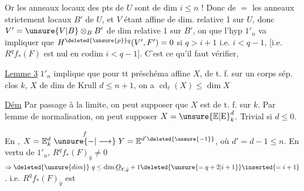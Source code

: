 Or les anneaux locaux des pts de $U$ sont
de dim \uline{$i\leq n$} ! Donc de $=$ les anneaux
strictement locaux $B'$ de $U$, et  $V$ étant
affine de dim. relative 1 sur $U$, donc
$V'=\unsure{V|B}\otimes_B B'$  de dim relative 1 sur $B'$, on
 que l'hyp $1'_n$ va impliquer
que $H^{\deleted{\unsure{p}}q}(V',F')=0$ si $q>i+1$ i.e. \uline{$i<q-1$},
[i.e. $R^qf_*(F)$ est nul en codim $i<q-1$].
C'est ce qu'il faut vérifier,  

\uline{Lemme 3} $1'_n$  
implique que
pour tt préschéma affine $X$,  de
t. f. sur un corps sép. clos $k$, $X$ de
dim de Krull $d\leq n+1$, on a $\operatorname{cd}_{\ell}(X)\leq\dim X$

\uline{Dém} Par passage à la limite, on peut supposer
que $X$ est de t. f. sur $k$.  
 Par lemme
de normalisation, on peut supposer $X={\unsure{\mathbb E|\mathrm E}}^d_k$.
 Trivial si $d\leq0$.

En , $X=\mathbb E^d_k\mathrel{\overset{f}{\unsure{-|\longrightarrow}}}Y=\mathbb E^{d'\deleted{\unsure{-1}}}$, où $d'=d-1\leq n$.
En vertu de $1'_n$, $R^qf_*(F)_{\bar y}\ne0$
$\Rightarrow\deleted{\unsure{dim}}\ q\leq\dim\underline O_{Y,\bar y}+1\deleted{\unsure{=q+2|i+1}}\inserted{=i+1}$. i.e. $R^q f_*(F)_{\bar y}$ est

